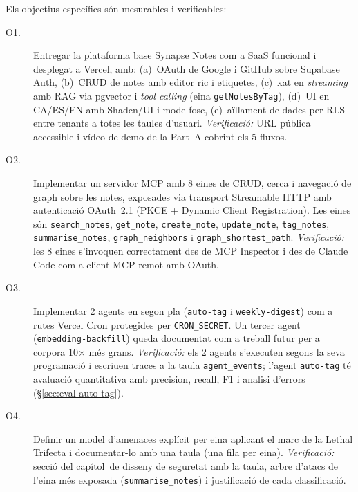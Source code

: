 Els objectius específics són mesurables i verificables:

\begin{sloppypar}

\begin{description}
  \item[O1.] Entregar la plataforma base Synapse Notes com a SaaS
    funcional i desplegat a Vercel, amb: (a)~OAuth de Google i GitHub
    sobre Supabase Auth, (b)~CRUD de notes amb editor ric i etiquetes,
    (c)~xat en \emph{streaming} amb RAG via pgvector i \emph{tool
    calling} (eina \texttt{getNotesByTag}), (d)~UI en CA/ES/EN amb
    Shadcn/UI i mode fosc, (e)~aïllament de dades per RLS entre
    tenants a totes les taules d'usuari.
    \emph{Verificació:} URL pública accessible i vídeo de demo de la
    Part~A cobrint els 5 fluxos.

  \item[O2.] Implementar un servidor MCP amb 8 eines de CRUD, cerca i
    navegació de graph sobre les notes, exposades via transport
    Streamable HTTP amb autenticació OAuth~2.1 (PKCE + Dynamic Client
    Registration). Les eines són \texttt{search\_notes},
    \texttt{get\_note}, \texttt{create\_note}, \texttt{update\_note},
    \texttt{tag\_notes}, \texttt{summarise\_notes},
    \texttt{graph\_neighbors} i \texttt{graph\_shortest\_path}.
    \emph{Verificació:} les 8 eines s'invoquen correctament des de MCP
    Inspector i des de Claude Code com a client MCP remot amb OAuth.

  \item[O3.] Implementar 2 agents en segon pla (\texttt{auto-tag}
    i \texttt{weekly-digest}) com a rutes Vercel Cron protegides per
    \texttt{CRON\_SECRET}. Un tercer agent
    (\texttt{embedding-backfill}) queda documentat com a treball futur
    per a corpora 10$\times$ més grans.
    \emph{Verificació:} els 2 agents s'executen segons la seva
    programació i escriuen traces a la taula \texttt{agent\_events};
    l'agent \texttt{auto-tag} té avaluació quantitativa amb precision,
    recall, F1 i analisi d'errors (\S\ref{sec:eval-auto-tag}).

  \item[O4.] Definir un model d'amenaces explícit per eina aplicant el
    marc de la Lethal Trifecta i documentar-lo amb una taula
    (una fila per eina).
    \emph{Verificació:} secció del capítol~de disseny de seguretat amb
    la taula, arbre d'atacs de l'eina més exposada
    (\texttt{summarise\_notes}) i justificació de cada classificació.


\end{description}
\end{sloppypar}
